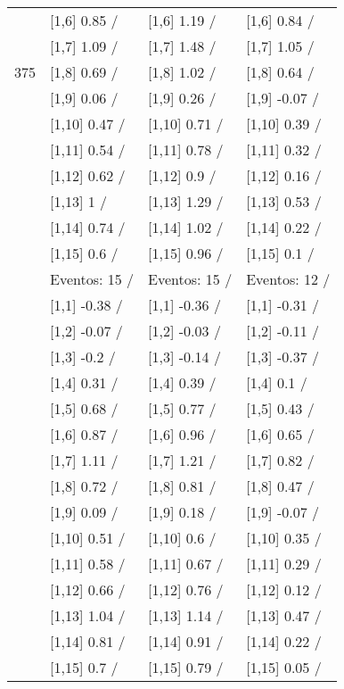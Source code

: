 \begin{table}
\begin{tabular}[t]{llll}
 & {}[1,6] 0.85  / & {}[1,6] 1.19  / & {}[1,6] 0.84  /\\
 & {}[1,7] 1.09  / & {}[1,7] 1.48  / & {}[1,7] 1.05  /\\
375 & {}[1,8] 0.69  / & {}[1,8] 1.02  / & {}[1,8] 0.64  /\\
\addlinespace
 & {}[1,9] 0.06  / & {}[1,9] 0.26  / & {}[1,9] -0.07  /\\
 & {}[1,10] 0.47  / & {}[1,10] 0.71  / & {}[1,10] 0.39  /\\
 & {}[1,11] 0.54  / & {}[1,11] 0.78  / & {}[1,11] 0.32  /\\
 & {}[1,12] 0.62  / & {}[1,12] 0.9  / & {}[1,12] 0.16  /\\
 & {}[1,13] 1  / & {}[1,13] 1.29  / & {}[1,13] 0.53  /\\
\addlinespace
 & {}[1,14] 0.74  / & {}[1,14] 1.02  / & {}[1,14] 0.22  /\\
 & {}[1,15] 0.6  / & {}[1,15] 0.96  / & {}[1,15] 0.1  /\\
 & Eventos:  15 / & Eventos:  15 / & Eventos:  12 /\\
 & {}[1,1] -0.38  / & {}[1,1] -0.36  / & {}[1,1] -0.31  /\\
 & {}[1,2] -0.07  / & {}[1,2] -0.03  / & {}[1,2] -0.11  /\\
\addlinespace
 & {}[1,3] -0.2  / & {}[1,3] -0.14  / & {}[1,3] -0.37  /\\
 & {}[1,4] 0.31  / & {}[1,4] 0.39  / & {}[1,4] 0.1  /\\
 & {}[1,5] 0.68  / & {}[1,5] 0.77  / & {}[1,5] 0.43  /\\
 & {}[1,6] 0.87  / & {}[1,6] 0.96  / & {}[1,6] 0.65  /\\
 & {}[1,7] 1.11  / & {}[1,7] 1.21  / & {}[1,7] 0.82  /\\
\addlinespace
500 & {}[1,8] 0.72  / & {}[1,8] 0.81  / & {}[1,8] 0.47  /\\
 & {}[1,9] 0.09  / & {}[1,9] 0.18  / & {}[1,9] -0.07  /\\
 & {}[1,10] 0.51  / & {}[1,10] 0.6  / & {}[1,10] 0.35  /\\
 & {}[1,11] 0.58  / & {}[1,11] 0.67  / & {}[1,11] 0.29  /\\
 & {}[1,12] 0.66  / & {}[1,12] 0.76  / & {}[1,12] 0.12  /\\
\addlinespace
 & {}[1,13] 1.04  / & {}[1,13] 1.14  / & {}[1,13] 0.47  /\\
 & {}[1,14] 0.81  / & {}[1,14] 0.91  / & {}[1,14] 0.22  /\\
 & {}[1,15] 0.7  / & {}[1,15] 0.79  / & {}[1,15] 0.05  /\\
\bottomrule
\end{tabular}
\end{table}
